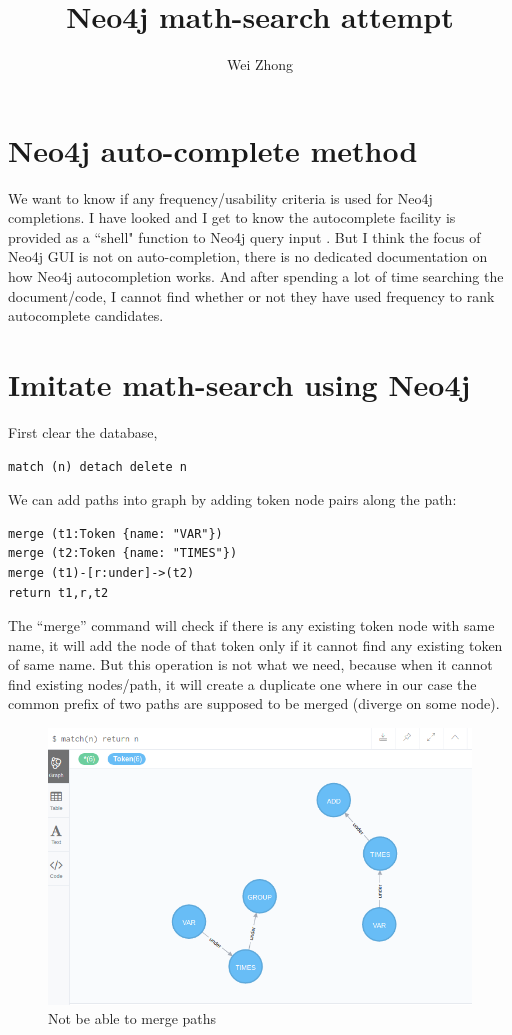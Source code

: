 \documentclass[a4paper]{article}
\title{Neo4j math-search attempt}
\author{Wei Zhong}
\begin{document}
\maketitle

\section{Neo4j auto-complete method}
We want to know if any frequency/usability criteria is used for Neo4j completions. I have looked \cite{officialsite, github, se, github_src} and I get to know the autocomplete facility is provided as a ``shell" function to Neo4j query input \cite{github_src}. But I think the focus of Neo4j GUI is not on auto-completion, there is no dedicated documentation on how Neo4j autocompletion works. And after spending a lot of time searching the document/code, I cannot find whether or not they have used frequency to rank autocomplete candidates.

\section{Imitate math-search using Neo4j}
First clear the database,
\begin{verbatim}
match (n) detach delete n
\end{verbatim}
We can add paths into graph by adding token node pairs along the path:
\begin{verbatim}
merge (t1:Token {name: "VAR"})
merge (t2:Token {name: "TIMES"})
merge (t1)-[r:under]->(t2)
return t1,r,t2
\end{verbatim}
The ``merge'' command will check if there is any existing token node with same name, it will add the node of that token only if it cannot find any existing token of same name. 
But this operation is not what we need, because when it cannot find existing nodes/path, it will create a duplicate one where in our case the common prefix of two paths are supposed to be merged (diverge on some node).
\begin{figure}
\centering
\includegraphics[width=1.0\textwidth]{fig1.png}
\caption{\label{fig1}Not be able to merge paths}
\end{figure}
\end{document}
